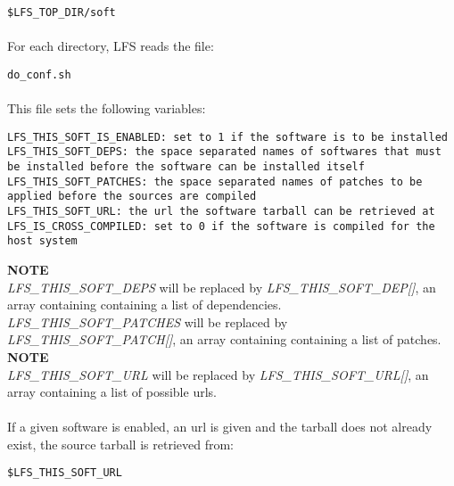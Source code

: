 \documentclass[a4paper, 11pt]{article}
\begin{document}
\begin{lstlisting}[frame=tb]
$LFS_TOP_DIR/soft
\end{lstlisting}

\paragraph{}
For each directory, LFS reads the file:\\

\begin{lstlisting}[frame=tb]
do_conf.sh
\end{lstlisting}

\paragraph{}
This file sets the following variables:\\

\begin{lstlisting}[frame=tb]
LFS_THIS_SOFT_IS_ENABLED: set to 1 if the software is to be installed
LFS_THIS_SOFT_DEPS: the space separated names of softwares that must
be installed before the software can be installed itself
LFS_THIS_SOFT_PATCHES: the space separated names of patches to be
applied before the sources are compiled
LFS_THIS_SOFT_URL: the url the software tarball can be retrieved at
LFS_IS_CROSS_COMPILED: set to 0 if the software is compiled for the
host system
\end{lstlisting}
\textbf{NOTE}\\
\textit{LFS\_THIS\_SOFT\_DEPS} will be replaced by
\textit{LFS\_THIS\_SOFT\_DEP[]}, an array containing containing a list of
dependencies.\\
\textit{LFS\_THIS\_SOFT\_PATCHES} will be replaced by
\textit{LFS\_THIS\_SOFT\_PATCH[]}, an array containing containing a list of
patches.\\
\textbf{NOTE}\\
\textit{LFS\_THIS\_SOFT\_URL} will be replaced by
\textit{LFS\_THIS\_SOFT\_URL[]}, an array containing a list of possible urls.

\paragraph{}
If a given software is enabled, an url is given and the tarball does not already
exist, the source tarball is retrieved from:\\

\begin{lstlisting}[frame=tb]
$LFS_THIS_SOFT_URL
\end{lstlisting}
\end{document}
